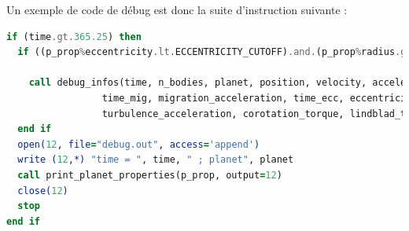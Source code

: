 Un exemple de code de débug est donc la suite d'instruction suivante :
\begin{lstlisting}[language=Fortran]
if (time.gt.365.25) then
  if ((p_prop%eccentricity.lt.ECCENTRICITY_CUTOFF).and.(p_prop%radius.gt.INNER_BOUNDARY_RADIUS)) then
  
    call debug_infos(time, n_bodies, planet, position, velocity, acceleration, &
                 time_mig, migration_acceleration, time_ecc, eccentricity_acceleration, &
                 turbulence_acceleration, corotation_torque, lindblad_torque, torque_ref, ecc_corot)
  end if
  open(12, file="debug.out", access='append')
  write (12,*) "time = ", time, " ; planet", planet
  call print_planet_properties(p_prop, output=12)
  close(12)
  stop
end if
\end{lstlisting}